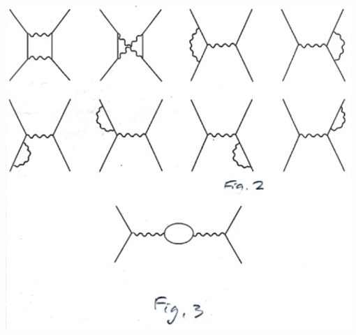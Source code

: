 \documentclass[a4paper,onecolumn,superscriptaddress,12pt,nofootinbib,twoside,raggedfooter,notitlepage]{revtex4-1}
\begin{document}
\begin{center}
	\includegraphics[width=0.98\textwidth]{figs/fig_i1}
\end{center}
\end{document}
